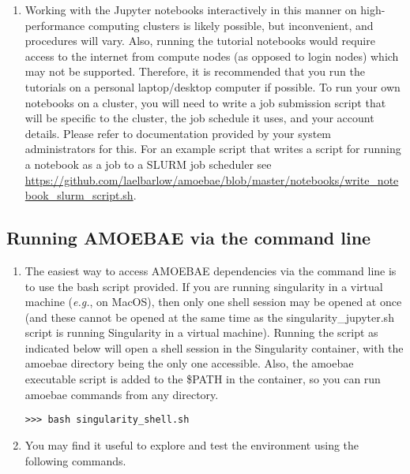 \documentclass[12pt,letterpaper]{article}
\begin{document}
\begin{linenumbers}
\begin{enumerate}
\item Working with the Jupyter notebooks interactively in this manner on
    high-performance computing clusters is likely possible, but inconvenient,
        and procedures will vary. Also, running the tutorial notebooks would
        require access to the internet from compute nodes (as opposed to login
        nodes) which may not be supported. Therefore, it is recommended that
        you run the tutorials on a personal laptop/desktop computer if
        possible. To run your own notebooks on a cluster, you will need to
        write a job submission script that will be specific to the cluster, the
        job schedule it uses, and your account details. Please refer to
        documentation provided by your system administrators for this. For an
        example script that writes a script for running a notebook as a job to
        a SLURM job scheduler see
        \url{https://github.com/laelbarlow/amoebae/blob/master/notebooks/write_notebook_slurm_script.sh}.
        

\end{enumerate}


\subsection{Running AMOEBAE via the command line}
\label{shell_section}

\begin{enumerate}

\item The easiest way to access AMOEBAE dependencies via the command line is to
    use the bash script provided. If you are running singularity in a virtual
        machine (\textit{e.g.}, on MacOS), then only one shell session may be
        opened at once (and these cannot be opened at the same time as the
        singularity\_jupyter.sh script is running Singularity in a virtual
        machine). Running the script as indicated below will open a shell
        session in the Singularity container, with the amoebae directory being
        the only one accessible. Also, the amoebae executable script is added
        to the \$PATH in the container, so you can run amoebae commands from
        any directory.

\begin{lstlisting}
>>> bash singularity_shell.sh
\end{lstlisting}

\item You may find it useful to explore and test the environment using the
    following commands.


\end{enumerate}
\end{linenumbers}
\end{document}
